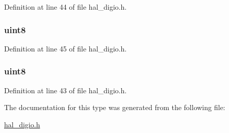 Definition at line 44 of file hal\_\-digio.h.

\hypertarget{typedigio_config_a678eac54e05e95b06144f3382aa18a2e}{
\subsubsection[{pin\_\-bm}]{ {\bfseries uint8 } }}
\label{typedigio_config_a678eac54e05e95b06144f3382aa18a2e}


Definition at line 45 of file hal\_\-digio.h.

\hypertarget{typedigio_config_acb208cab036c35aca1dff3c0c394ba95}{
\subsubsection[{port}]{ {\bfseries uint8 } }}
\label{typedigio_config_acb208cab036c35aca1dff3c0c394ba95}


Definition at line 43 of file hal\_\-digio.h.



The documentation for this type was generated from the following file:\begin{DoxyCompactItemize}
\item 
\hyperlink{hal__digio_8h}{hal\_\-digio.h}\end{DoxyCompactItemize}
